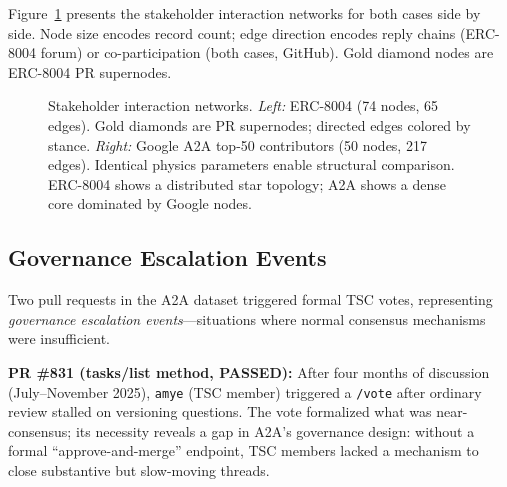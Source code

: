 \documentclass[conference]{IEEEtran}
\begin{document}
Figure~\ref{fig:network_compare} presents the stakeholder interaction networks
for both cases side by side. Node size encodes record count; edge direction
encodes reply chains (ERC-8004 forum) or co-participation (both cases, GitHub).
Gold diamond nodes are ERC-8004 PR supernodes.

\begin{figure}[htbp]
  \centering
  \caption{Stakeholder interaction networks. \textit{Left:} ERC-8004 (74 nodes,
  65 edges). Gold diamonds are PR supernodes; directed edges colored by stance.
  \textit{Right:} Google A2A top-50 contributors (50 nodes, 217 edges).
  Identical physics parameters enable structural comparison. ERC-8004 shows
  a distributed star topology; A2A shows a dense core dominated by Google nodes.}
  \label{fig:network_compare}
\end{figure}

\subsection{Governance Escalation Events}

Two pull requests in the A2A dataset triggered formal TSC votes, representing
\textit{governance escalation events}---situations where normal consensus
mechanisms were insufficient.

\textbf{PR \#831 (tasks/list method, PASSED):} After four months of
discussion (July--November 2025), \texttt{amye} (TSC member) triggered
a \texttt{/vote} after ordinary review stalled on versioning questions.
The vote formalized what was near-consensus; its necessity reveals a gap
in A2A's governance design: without a formal ``approve-and-merge''
endpoint, TSC members lacked a mechanism to close substantive but
slow-moving threads.
\end{document}
